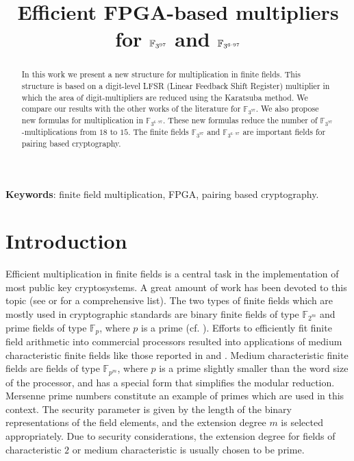 \documentclass{article}
\title{Efficient FPGA-based multipliers for $\F_{3^{97}}$ and $\F_{3^{6 \cdot 97}}$}
\newcommand{\F}{\mathbb{F}}
\begin{document}
\maketitle




\begin{abstract}
In this work we present a new structure for multiplication in finite fields. 
This structure is based on a digit-level LFSR (Linear Feedback Shift
Register) multiplier in which the area of digit-multipliers are
reduced using the Karatsuba method. We compare our results with the
other works of the literature for $\F_{3^{97}}$. We also propose new
formulas for multiplication in $\F_{3^{6 \cdot 97}}$. These new
formulas reduce the number of $\F_{3^{97}}$-multiplications from $18$
to $15$. The finite fields $\F_{3^{97}}$ and $\F_{3^{6 \cdot 97}}$ are
important fields for pairing based cryptography. 
\end{abstract}


{\bf Keywords}: finite field multiplication, FPGA, pairing based
cryptography.

\section{Introduction}
\label{sec:intro}

Efficient multiplication in finite fields is a central task in the
implementation of most public key cryptosystems. A great amount of
work has been devoted to this topic (see \cite{knu98} or
\cite{gatger03} for a comprehensive list).
The two types of finite fields which are mostly used in cryptographic
standards are binary finite fields of type $\F_{2^{m}}$ and prime
fields of type $\F_{p}$, where $p$ is a prime (cf. \cite{dss00}).
Efforts to efficiently fit finite field arithmetic into commercial
processors resulted into applications of medium characteristic finite
fields like those reported in \cite{baipaa98} and \cite{avamih03}.
Medium characteristic finite fields are fields of type $\F_{p^{m}}$,
where $p$ is a prime slightly smaller than the word size of the
processor, and has a special form that simplifies the modular
reduction. Mersenne prime numbers constitute an example of primes
which are used in this context. 
The security parameter is given by the length of the binary
representations of the field elements, and the extension degree $m$ is
selected appropriately.
Due to security considerations, the extension degree for fields of
characteristic $2$ or medium characteristic is usually chosen to be
prime.
\end{document}

